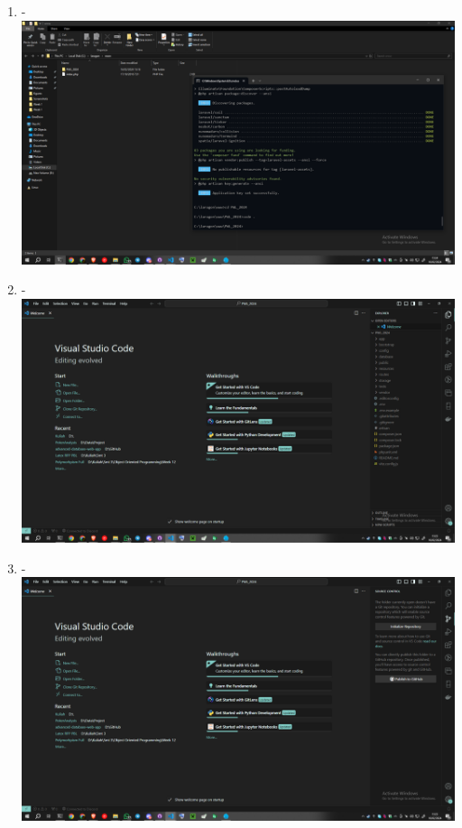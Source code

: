\documentclass[12pt,titlepage]{article}
\begin{document}
\begin{enumerate}[label= \alph*.]
    \item - \\ \includegraphics[width=.9\textwidth]{images/figures/Github Publish 1.png}
    \item - \\ \includegraphics[width=.9\textwidth]{images/figures/Github Publish 2.png}
    \newpage
    \item - \\ \includegraphics[width=.9\textwidth]{images/figures/Github Publish 3.png}

\end{enumerate}
\end{document}
